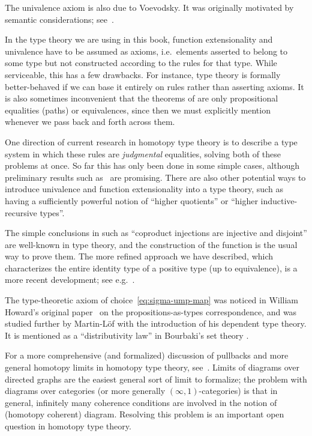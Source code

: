 The univalence axiom is also due to Voevodsky.
It was originally motivated by semantic considerations; see~\cite{klv:ssetmodel}.

In the type theory we are using in this book, function extensionality and univalence have to be assumed as axioms, i.e.\ elements asserted to belong to some type but not constructed according to the rules for that type.
While serviceable, this has a few drawbacks.
For instance, type theory is formally better-behaved if we can base it entirely on rules rather than asserting axioms.
It is also sometimes inconvenient that the theorems of  are only propositional equalities (paths) or equivalences, since then we must explicitly mention whenever we pass back and forth across them.

One direction of current research in homotopy type theory is to describe a type system in which these rules are \emph{judgmental} equalities, solving both of these problems at once.
So far this has only been done in some simple cases, although preliminary results such as~\cite{lh:canonicity} are promising.
There are also other potential ways to introduce univalence and function extensionality into a type theory, such as having a sufficiently powerful notion of ``higher quotients'' or ``higher inductive-recursive types''.

The simple conclusions in  such as ``coproduct injections are injective and disjoint'' are well-known in type theory, and the construction of the function \encode is the usual way to prove them.
The more refined approach we have described, which characterizes the entire identity type of a positive type (up to equivalence), is a more recent development; see e.g.~\cite{ls:pi1s1}.

The type-theoretic axiom of choice~\eqref{eq:sigma-ump-map} was noticed in William Howard's original paper~\cite{howard:pat} on the propositions-as-types correspondence, and was studied further by Martin-L\"of with the introduction of his dependent type theory.  It is mentioned as a ``distributivity law'' in Bourbaki's set theory \cite{Bourbaki}.

For a more comprehensive (and formalized) discussion of pullbacks and more general homotopy limits in homotopy type theory, see~\cite{AKL13}.
Limits of diagrams over directed graphs are the easiest general sort of limit to formalize; the problem with diagrams over categories (or more generally $(\infty,1)$-categories) is that in general, infinitely many coherence conditions are involved in the notion of (homotopy coherent) diagram.
Resolving this problem is an important open question in homotopy type theory.


